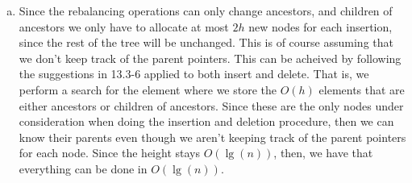 \documentclass{article}
\begin{document}
\begin{enumerate}[a.]
\item
Since the rebalancing operations can only change ancestors, and children of ancestors we only have to allocate at most $2h$ new nodes for each insertion, since the rest of the tree will be unchanged. This is of course assuming that we don't keep track of the parent pointers. This can be acheived by following the suggestions in 13.3-6 applied to both insert and delete. That is, we perform a search for the element where we store the $O(h)$ elements that are either ancestors or children of ancestors. Since these are the only nodes under consideration when doing the insertion and deletion procedure, then we can know their parents even though we aren't keeping track of the parent pointers for each node. Since the height stays $O(\lg(n))$, then, we have that everything can be done in $O(\lg(n))$.


\end{enumerate}
\end{document}
